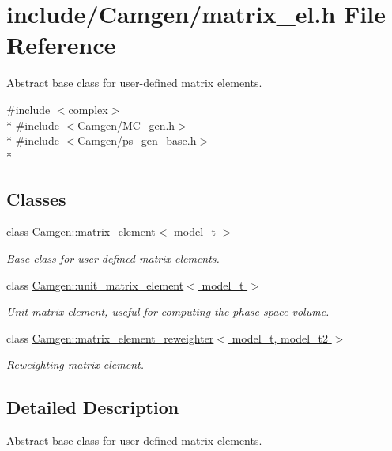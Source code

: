 \hypertarget{a00669}{\section{include/\-Camgen/matrix\-\_\-el.h File Reference}
\label{a00669}
}


Abstract base class for user-\/defined matrix elements.  


{\ttfamily \#include $<$complex$>$}\\*
{\ttfamily \#include $<$Camgen/\-M\-C\-\_\-gen.\-h$>$}\\*
{\ttfamily \#include $<$Camgen/ps\-\_\-gen\-\_\-base.\-h$>$}\\*
\subsection*{Classes}
\begin{DoxyCompactItemize}
\item 
class \hyperlink{a00359}{Camgen\-::matrix\-\_\-element$<$ model\-\_\-t $>$}
\begin{DoxyCompactList}\small\item\em Base class for user-\/defined matrix elements. \end{DoxyCompactList}\item 
class \hyperlink{a00553}{Camgen\-::unit\-\_\-matrix\-\_\-element$<$ model\-\_\-t $>$}
\begin{DoxyCompactList}\small\item\em Unit matrix element, useful for computing the phase space volume. \end{DoxyCompactList}\item 
class \hyperlink{a00360}{Camgen\-::matrix\-\_\-element\-\_\-reweighter$<$ model\-\_\-t, model\-\_\-t2 $>$}
\begin{DoxyCompactList}\small\item\em Reweighting matrix element. \end{DoxyCompactList}\end{DoxyCompactItemize}


\subsection{Detailed Description}
Abstract base class for user-\/defined matrix elements. 